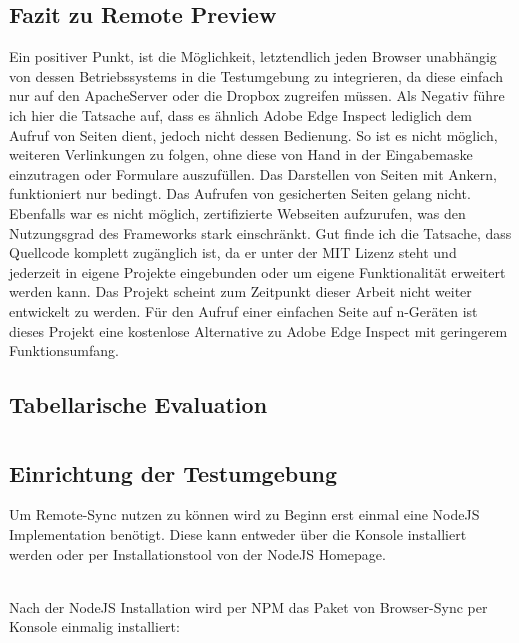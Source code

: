 		\subsection{Fazit zu Remote Preview}
		Ein positiver Punkt, ist die Möglichkeit, letztendlich jeden Browser unabhängig von dessen Betriebssystems in die 				Testumgebung zu integrieren, da diese einfach nur auf den ApacheServer oder die Dropbox zugreifen müssen. Als Negativ 		führe ich hier die Tatsache auf, dass es ähnlich Adobe Edge Inspect lediglich dem Aufruf von Seiten dient, jedoch nicht 			dessen Bedienung. So ist es nicht möglich, weiteren Verlinkungen zu folgen, ohne diese von Hand in der Eingabemaske 			einzutragen oder Formulare auszufüllen. Das Darstellen von Seiten mit Ankern, funktioniert nur bedingt. Das Aufrufen von 			gesicherten Seiten gelang nicht. Ebenfalls war es nicht möglich, zertifizierte Webseiten aufzurufen, was den 				Nutzungsgrad des Frameworks stark einschränkt. Gut finde ich die Tatsache, dass Quellcode komplett zugänglich ist, da er 		unter der MIT Lizenz steht und	jederzeit in eigene Projekte eingebunden oder um eigene Funktionalität erweitert werden 			kann. Das Projekt 				scheint zum Zeitpunkt dieser Arbeit nicht weiter entwickelt zu werden. Für den Aufruf einer einfachen Seite auf n-Geräten 		ist dieses Projekt eine kostenlose Alternative zu Adobe Edge Inspect mit geringerem Funktionsumfang.
		
				
		\subsection{Tabellarische Evaluation}
		
	
\pagebreak
	\section{}	
	\subsection{Einrichtung der Testumgebung}
	Um Remote-Sync nutzen zu können wird zu Beginn erst einmal eine NodeJS Implementation benötigt. Diese kann entweder über die Konsole installiert werden oder per Installationstool von der NodeJS Homepage.
	
	\\Nach der NodeJS Installation wird per NPM das Paket von Browser-Sync per Konsole einmalig installiert:
	
